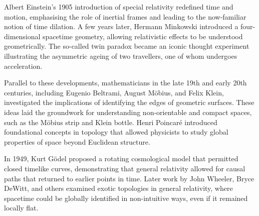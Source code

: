 \begin{historical}
Albert Einstein’s 1905 introduction of special relativity redefined time and motion, emphasising the role of inertial frames and leading to the now-familiar notion of time dilation. A few years later, Hermann Minkowski introduced a four-dimensional spacetime geometry, allowing relativistic effects to be understood geometrically. The so-called \QSOpen{}twin paradox\QSClose{} became an iconic thought experiment illustrating the asymmetric ageing of two travellers, one of whom undergoes acceleration.

Parallel to these developments, mathematicians in the late 19th and early 20th centuries, including Eugenio Beltrami, August Möbius, and Felix Klein, investigated the implications of identifying the edges of geometric surfaces. These ideas laid the groundwork for understanding non-orientable and compact spaces, such as the Möbius strip and Klein bottle. Henri Poincaré introduced foundational concepts in topology that allowed physicists to study global properties of space beyond Euclidean structure.

In 1949, Kurt Gödel proposed a rotating cosmological model that permitted closed timelike curves, demonstrating that general relativity allowed for causal paths that returned to earlier points in time. Later work by John Wheeler, Bryce DeWitt, and others examined exotic topologies in general relativity, where spacetime could be globally identified in non-intuitive ways, even if it remained locally flat.
\end{historical}
